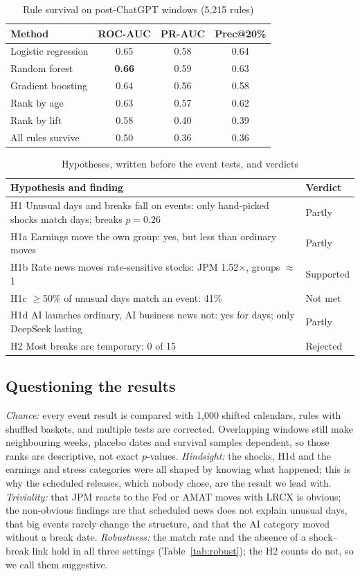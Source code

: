 \documentclass[conference]{IEEEtran}
\begin{document}
\begin{table}[t]
\caption{Rule survival on post-ChatGPT windows (5,215 rules)}
\label{tab:models}
\centering
\small
\begin{tabular}{lccc}
\toprule
Method & ROC-AUC & PR-AUC & Prec@20\% \\
\midrule
Logistic regression & 0.65 & 0.58 & 0.64 \\
Random forest & \textbf{0.66} & 0.59 & 0.63 \\
Gradient boosting & 0.64 & 0.56 & 0.58 \\
\midrule
Rank by age & 0.63 & 0.57 & 0.62 \\
Rank by lift & 0.58 & 0.40 & 0.39 \\
All rules survive & 0.50 & 0.36 & 0.36 \\
\bottomrule
\end{tabular}
\end{table}

\begin{table}[t]
\caption{Hypotheses, written before the event tests, and verdicts}
\label{tab:scorecard}
\centering
\small
\begin{tabular}{p{}l}
\toprule
Hypothesis and finding & Verdict \\
\midrule
H1 Unusual days and breaks fall on events: only hand-picked shocks match days; breaks $p=0.26$ & Partly \\
H1a Earnings move the own group: yes, but less than ordinary moves & Partly \\
H1b Rate news moves rate-sensitive stocks: JPM 1.52$\times$, groups $\approx$1 & Supported \\
H1c $\geq$50\% of unusual days match an event: 41\% & Not met \\
H1d AI launches ordinary, AI business news not: yes for days; only DeepSeek lasting & Partly \\
H2 Most breaks are temporary: 0 of 15 & Rejected \\
\bottomrule
\end{tabular}
\end{table}

\subsection{Questioning the results}
\emph{Chance:} every event result is compared with 1,000 shifted calendars, rules with shuffled baskets, and multiple tests are corrected. Overlapping windows still make neighbouring weeks, placebo dates and survival samples dependent, so those ranks are descriptive, not exact $p$-values. \emph{Hindsight:} the shocks, H1d and the earnings and stress categories were all shaped by knowing what happened; this is why the scheduled releases, which nobody chose, are the result we lead with. \emph{Triviality:} that JPM reacts to the Fed or AMAT moves with LRCX is obvious; the non-obvious findings are that scheduled news does not explain unusual days, that big events rarely change the structure, and that the AI category moved without a break date. \emph{Robustness:} the match rate and the absence of a shock--break link hold in all three settings (Table~\ref{tab:robust}); the H2 counts do not, so we call them suggestive.
\end{document}
